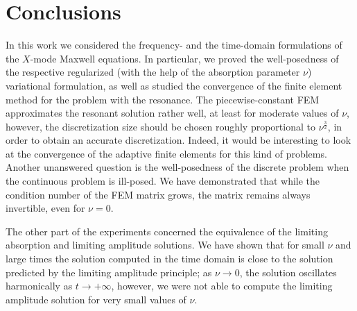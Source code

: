 \section{Conclusions}
In this work we considered the frequency- and the time-domain formulations of the $X$-mode Maxwell equations. 
In particular, we proved the well-posedness of the respective regularized (with the help of 
the absorption parameter $\nu$) variational formulation, as 
well as studied the convergence of the finite element method for the problem with the resonance. 
The piecewise-constant FEM approximates the resonant solution rather well, at least for moderate values of $\nu$, 
however, the discretization size should be chosen roughly proportional to $\nu^{\frac{3}{2}}$, in order to obtain an accurate discretization.
Indeed, it would be interesting to look at the convergence of the adaptive finite elements for this kind of problems. 
Another unanswered question is the well-posedness of the discrete problem when the continuous problem is ill-posed. We have 
demonstrated that while the condition number of the FEM matrix grows, the matrix remains always invertible, even for $\nu=0$. 

The other part of the experiments concerned the equivalence of the limiting absorption and limiting amplitude solutions. We have shown 
that for small $\nu$ and large times the solution computed in the time domain is close to the solution predicted by the limiting amplitude principle; as 
$\nu\rightarrow 0$, the solution oscillates harmonically as $t\rightarrow +\infty$, however, we were not able to compute the limiting amplitude solution for very 
small values of $\nu$. 